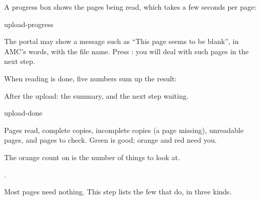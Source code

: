 \documentclass[11pt]{article}
\begin{document}
A progress box shows the pages being read, which takes a few seconds per page:

\begin{center}
\begin{shot}[0.55\linewidth]{upload-progress}\end{shot}
\end{center}

\begin{tip}
The portal may show a message such as ``This page seems to be blank'', in AMC's words, with the file name. Press : you will deal with such pages in the next step.
\end{tip}

When reading is done, five numbers sum up the result:

\begin{keep}
\begin{guidefig}{After the upload: the summary, and the next step waiting.}
\begin{shot}[0.85\linewidth]{upload-done}
\end{shot}
\end{guidefig}
\begin{callouts}
  \item Pages read, complete copies, incomplete copies (a page missing), unreadable pages, and pages to check. Green is good; orange and red need you.
  \item The orange count on  is the number of things to look at.
  \item {}.
\end{callouts}
\end{keep}

\label{step:check}

Most pages need nothing. This step lists the few that do, in three kinds.
\end{document}
